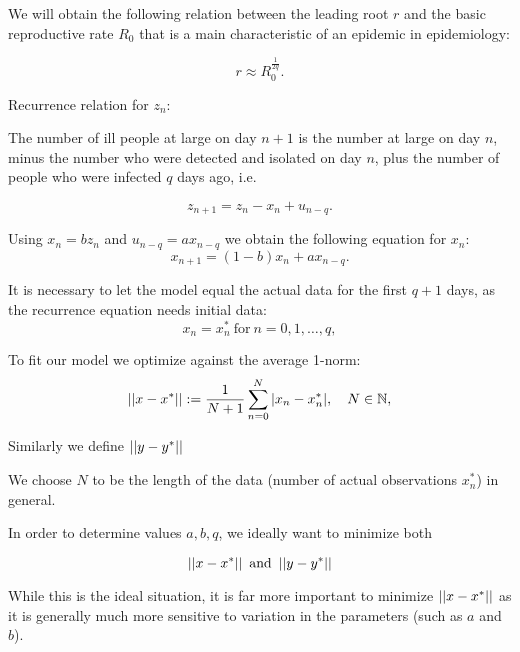 We will obtain the following relation between the leading root $r$ and the basic reproductive rate $R_0$ that is a main characteristic of an epidemic in epidemiology:

\begin{equation}\label{eq:R0}
    r \approx R_0^{\frac1{2q}}.
\end{equation}

Recurrence relation for $z_n$:

The number of ill people at large on day $n+1$ is the number at large on day $n$, minus the number who were detected and isolated on day $n$, plus the number of people who were infected $q$ days ago, i.e. 

\begin{equation} \label{eq:znrecurr}
    z_{n+1} = z_n - x_n + u_{n-q}.
\end{equation}

Using $x_n = bz_n$ and $u_{n-q} = ax_{n-q}$ we obtain the following equation for $x_n$:
\begin{equation} \label{eq:xnrecurr}
    x_{n+1} = (1 - b) x_n + ax_{n-q}.
\end{equation}

It is necessary to let the model equal the actual data for the first $q+1$ days, as the recurrence equation needs initial data:
\begin{equation} \label{eq:xn0q}
x_n = x^*_n \ \text{for} \ n = 0, 1, \dots , q,
\end{equation}

 To fit our model we optimize against the average 1-norm:
\begin{equation}\label{eq:xnnorm}
    \left|\left|x-x^*\right|\right|:= \frac{1}{N+1} \sum\limits_{n=0}^N |x_n-x_n^*|, \quad N\in \mathbb{N},
\end{equation}

Similarly we define $\left|\left|y-y^*\right|\right|$

We choose $N$ to be the length of the data (number of actual observations $x_n^*$) in general.

In order to determine values $a,b,q$, we ideally want to minimize both 

\begin{equation} \label{eq:norms}
    \left|\left|x-x^*\right|\right| \ \text{and} \ \left|\left|y-y^*\right|\right|
\end{equation}

While this is the ideal situation, it is far more important to minimize $\left|\left|x-x^*\right|\right|$ as it is generally much more sensitive to variation in the parameters (such as $a$ and $b$).


